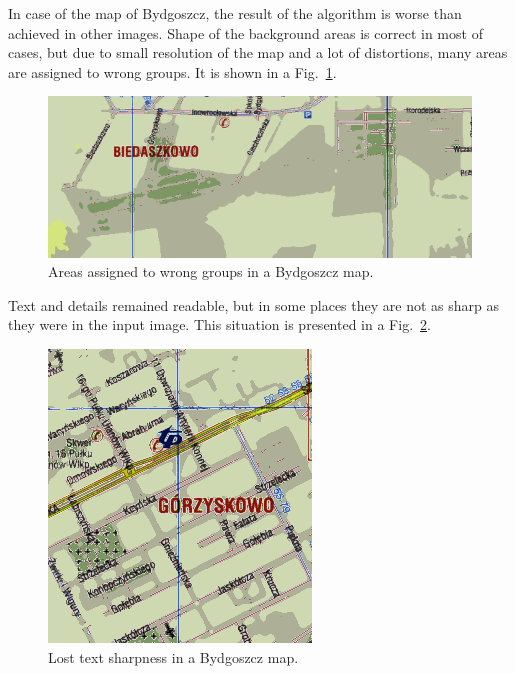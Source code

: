 \documentclass[a4paper,onecolumn,oneside,12pt]{memoir}
\begin{document}
In case of the map of Bydgoszcz, the result of the algorithm is worse than achieved in other
images. Shape of the background areas is correct in most of cases, but due to small resolution of
the map and a lot of distortions, many areas are assigned to wrong groups. It is shown in a
Fig.~\ref{bydgoszczBadAreas}.

\begin{figure}[!ht]
\begin{center}
\includegraphics[scale=0.4]{images/bydgoszczBadAreas.png}
\caption{Areas assigned to wrong groups in a Bydgoszcz map.}
\label{bydgoszczBadAreas}
\end{center}
\end{figure}

Text and details remained readable, but in some places they are not as sharp as they were in the
input image. This situation is presented in a Fig.~\ref{bydgoszczBadSharpness}.

\begin{figure}[!ht]
\begin{center}
\includegraphics[scale=0.7]{images/bydgoszczBadSharpness.png}
\caption{Lost text sharpness in a Bydgoszcz map.}
\label{bydgoszczBadSharpness}
\end{center}
\end{figure}
\end{document}
